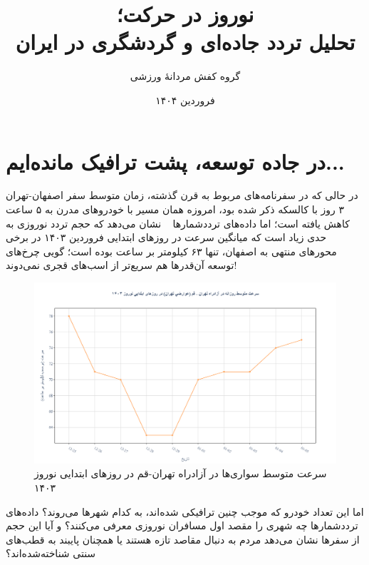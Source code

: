 \documentclass[a4paper, 12pt]{article}
\begin{document}
\title{نوروز در حرکت؛\\ تحلیل تردد جاده‌ای و گردشگری در ایران}
\author{گروه کفش مردانهٔ ورزشی}
\date{فروردین ۱۴۰۴}
\maketitle

\section{در جاده توسعه، پشت ترافیک مانده‌ایم...}
در حالی که در سفرنامه‌های مربوط به قرن گذشته، زمان متوسط سفر اصفهان-تهران ۳ روز با کالسکه ذکر شده بود، امروزه همان مسیر با خودروهای مدرن به ۵ ساعت کاهش یافته است؛ اما داده‌های ترددشمارها
~\cite{rahdari}
نشان می‌دهد که حجم تردد نوروزی به حدی زیاد است که میانگین 
 سرعت در روزهای ابتدایی فروردین ۱۴۰۳ در برخی محورهای منتهی به اصفهان، تنها ۶۳ کیلومتر بر ساعت بوده است؛ گویی چرخ‌های توسعه آن‌قدرها هم سریع‌تر از اسب‌های قجری نمی‌دوند!

\begin{figure}[htbp]
    \centering
    \includegraphics[width=1\textwidth]{first_part.png}
    \caption{سرعت متوسط سواری‌ها در آزادراه تهران-قم در روزهای ابتدایی نوروز ۱۴۰۳}
\end{figure}

اما این تعداد خودرو که موجب چنین ترافیکی شده‌اند، به کدام شهرها می‌روند؟ داده‌های ترددشمارها چه شهری را مقصد اول مسافران نوروزی معرفی می‌کنند؟ و آیا این حجم از سفرها نشان می‌دهد مردم به دنبال مقاصد تازه هستند یا همچنان پایبند به قطب‌های سنتی شناخته‌شده‌اند؟
\end{document}

